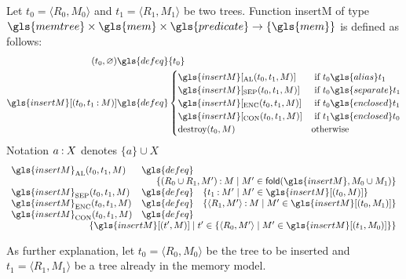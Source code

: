 \begin{definition}\label{def:insert}
  Let $t_0 = \langle R_0,M_0\rangle$ and $t_1 = \langle R_1,M_1\rangle$ be two trees. Function
  \gls{insertM} of type $\gls{memtree}\times\gls{mem}\times\gls{predicate}\rightarrow\{\gls{mem}\}$
  is defined as follows:
  \begin{align*}
    (t_0,\varnothing) &\gls{defeq} \{t_0\}\notag \\
    \gls{insertM}[(t_0,t_1\cons M)] &\gls{defeq} \begin{cases}
      \gls{insertM}[_\text{AL}(t_0,t_1,M)] & \text{ if } t_0\gls{alias}t_1 \\
      \gls{insertM}[_\text{SEP}(t_0,t_1,M)] & \text{ if } t_0\gls{separate}t_1 \\
      \gls{insertM}[_\text{ENC}(t_0,t_1,M)] & \text{ if } t_0\gls{enclosed}t_1 \\
      \gls{insertM}[_\text{CON}(t_0,t_1,M)] & \text{ if } t_1\gls{enclosed}t_0 \\
      \mbox{destroy}(t_0, M)  & \text{otherwise}
    \end{cases}
  \end{align*}
  Notation $a \mathbin{:} X$ denotes $\{a\} \cup X$ %
  \begin{equation*}
    \begin{array}{lcl}
      \gls{insertM}_\text{AL}(t_0,t_1,M) &\gls{defeq}& \\
      \multicolumn{3}{r}{\{(R_0\cup R_1, M') \cons M \mid M' \in \mathsf{fold}(\gls{insertM}, M_0 \cup M_1) \}} \\
      \gls{insertM}_\text{SEP}(t_0,t_1,M) &\gls{defeq}& \{t_1\cons M'\mid M'\in\gls{insertM}[(t_0,M)]\} \\
      \gls{insertM}_\text{ENC}(t_0,t_1,M) &\gls{defeq}& \{\langle R_1,M'\rangle\cons M\mid M'\in\gls{insertM}[(t_0,M_1)]\} \\
      \gls{insertM}_\text{CON}(t_0,t_1,M) &\gls{defeq}& \\
      \multicolumn{3}{r}{ \{\gls{insertM}[(t',M)]\mid t'\in\{\langle R_0,M'\rangle\mid M'\in \gls{insertM}[(t_1,M_0)]\}\}}
    \end{array}
  \end{equation*}
\end{definition}
As further explanation, let $t_0 = \langle R_0,M_0\rangle$ be the tree to be inserted and $t_1 = \langle R_1,M_1\rangle$ be a tree already in the memory model.
